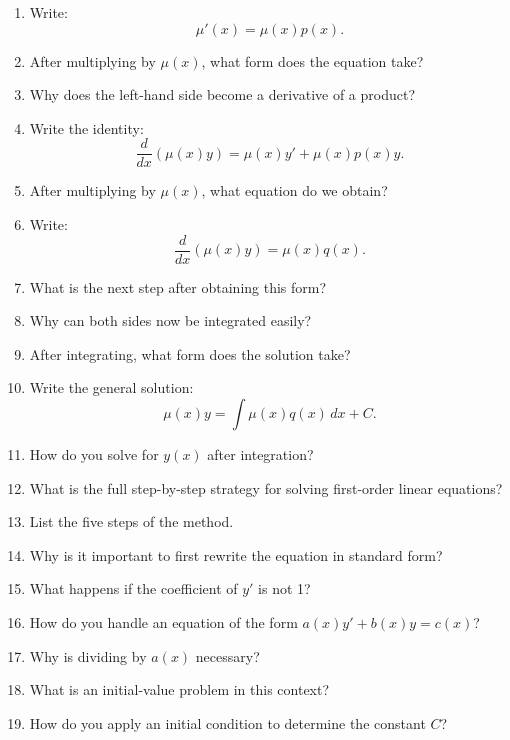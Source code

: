 \begin{enumerate}
\item Write:
  \[
    \mu'(x) = \mu(x)p(x).
  \]

\item After multiplying by $\mu(x)$, what form does the equation take?

\item Why does the left-hand side become a derivative of a product?

\item Write the identity:
  \[
    \frac{d}{dx}(\mu(x)y) = \mu(x)y' + \mu(x)p(x)y.
  \]

\item After multiplying by $\mu(x)$, what equation do we obtain?

\item Write:
  \[
    \frac{d}{dx}(\mu(x)y) = \mu(x)q(x).
  \]

\item What is the next step after obtaining this form?

\item Why can both sides now be integrated easily?

\item After integrating, what form does the solution take?

\item Write the general solution:
  \[
    \mu(x)y = \int \mu(x)q(x)\,dx + C.
  \]

\item How do you solve for $y(x)$ after integration?

\item What is the full step-by-step strategy for solving first-order linear equations?

\item List the five steps of the method.

\item Why is it important to first rewrite the equation in standard form?

\item What happens if the coefficient of $y'$ is not 1?

\item How do you handle an equation of the form $a(x)y' + b(x)y = c(x)$?

\item Why is dividing by $a(x)$ necessary?

\item What is an initial-value problem in this context?

\item How do you apply an initial condition to determine the constant $C$?


\end{enumerate}
